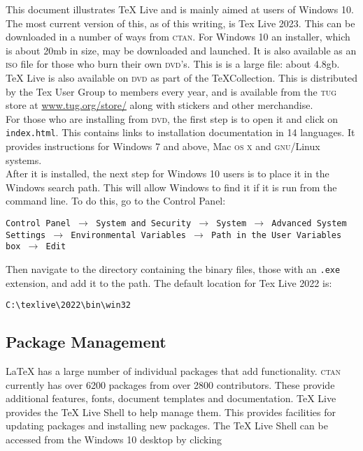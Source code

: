 \documentclass[12pt, a4paper]{article}
\begin{document}
This document illustrates TeX Live and is mainly aimed at users of Windows 10. The most current version of this, as of this writing, is Tex Live 2023. This can be downloaded in a number of ways from \textsc{ctan}. For Windows 10 an installer, which is about 20mb in size, may be downloaded and launched. It is also available as an \textsc{iso} file for those who burn their own \textsc{dvd}'s. This is is a large file: about 4.8gb. TeX Live is also available on \textsc{dvd} as part of the \TeX Collection. This is distributed by the Tex User Group to members every year, and is available from the \textsc{tug} store at \url{www.tug.org/store/} along with stickers and other merchandise. \\

For those who are installing from \textsc{dvd}, the first step is to open it and click on \texttt{index.html}. This contains links to installation documentation in 14 languages. It provides instructions for Windows 7 and above, Mac \textsc{os x} and \textsc{gnu}/Linux systems. \\

After it is installed, the next step for Windows 10 users is to place it in the Windows search path. This will allow Windows to find it if it is run from the command line. To do this, go to the Control Panel:


\begin{flushleft}
\texttt{Control Panel $\rightarrow$ System and Security $\rightarrow$ System $\rightarrow$ Advanced System Settings $\rightarrow$ Environmental Variables $\rightarrow$ Path in the User Variables box $\rightarrow$ Edit}
\end{flushleft}


Then navigate to the directory containing the binary files, those with an \texttt{.exe} extension, and add it to the path. The default location for Tex Live 2022 is: 

{\small
\begin{verbatim}
C:\texlive\2022\bin\win32
\end{verbatim}
}

\subsection{Package Management}

LaTeX has a large number of individual packages that add functionality. \textsc{ctan} currently has over 6200 packages from over 2800 contributors. These provide additional features, fonts, document templates and documentation. TeX Live provides the TeX Live Shell to help manage them. This provides facilities for updating packages and installing new packages. The TeX Live Shell can be accessed from the Windows 10 desktop by clicking 
\end{document}
